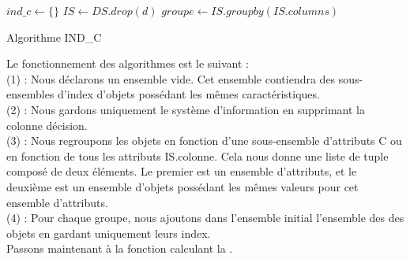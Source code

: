 \begin{algorithm}[h!]
	\SetAlgoLined
	\LinesNumbered
	$ind\_c \gets \{\}$ \;
	$IS \gets DS.drop(d)$ \;
	$groupe \gets IS.groupby(IS.columns)$ \;
	\caption{Algorithme IND\_C}
\end{algorithm}
\newpage
Le fonctionnement des algorithmes est le suivant : \\
(1) : Nous déclarons un ensemble vide. Cet ensemble contiendra des
sous-ensembles d'index d'objets possédant les mêmes caractéristiques. \\
(2) : Nous gardons uniquement le système d'information
en supprimant la colonne décision. \\
(3) : Nous regroupons les objets en fonction d'une sous-ensemble
d'attributs C ou en fonction de tous les attributs IS.colonne.
Cela nous donne une liste de tuple composé de deux éléments. Le premier
est un ensemble d'attributs, et le deuxième est un ensemble d'objets possédant
les mêmes valeurs pour cet ensemble d'attributs. \\
(4) : Pour chaque groupe, nous ajoutons dans l'ensemble initial
l'ensemble des des objets en gardant uniquement leurs index. \\
Passons maintenant à la fonction calculant la \bupper.
